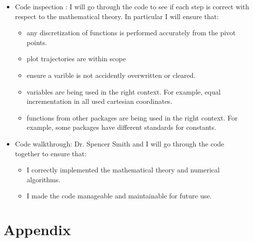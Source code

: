 \documentclass[12pt, titlepage]{article}
\begin{document}
\begin{itemize}
	\item Code inspection : I will 
	go through the code to see if each step is correct with respect to the
	mathematical theory. In particular I will ensure that: 
	\begin{itemize}
		\item any discretization of functions is performed accurately from the pivot points. 
		\item plot trajectories are within scope
		\item ensure a varible is not accidently  overwritten or cleared. 
		\item variables are being used in the right context. 
		For example, equal incrementation in all used cartesian coordinates. 
		\item functions from other packages are being used in the right 
		context. For example, some packages have different standards for 
		constants.
	\end{itemize} 
	\item Code walkthrough: Dr. Spencer Smith and I will go through the code 
	together to ensure that: 
	\begin{itemize}
		\item I correctly implemented the mathematical theory and numerical 
		algorithms.
		\item I made the code manageable and maintainable for future use.
	\end{itemize}
\end{itemize}


				




\newpage

\section{Appendix}
\end{document}
